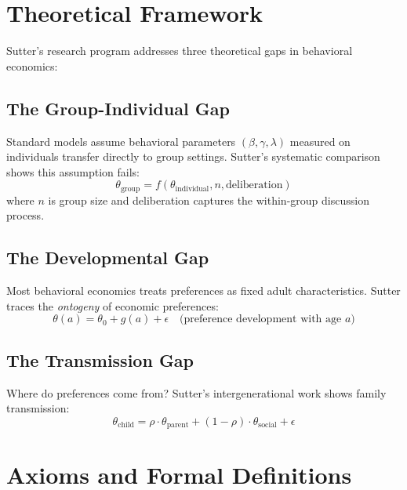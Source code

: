 \section{Theoretical Framework}
\label{sec:su-theory}

Sutter's research program addresses three theoretical gaps in behavioral economics:

\subsection{The Group-Individual Gap}

Standard models assume behavioral parameters $(\beta, \gamma, \lambda)$ measured on individuals transfer directly to group settings. Sutter's systematic comparison shows this assumption fails:
\begin{equation}
\theta_{\text{group}} = f(\theta_{\text{individual}}, n, \text{deliberation})
\end{equation}
where $n$ is group size and deliberation captures the within-group discussion process.

\subsection{The Developmental Gap}

Most behavioral economics treats preferences as fixed adult characteristics. Sutter traces the \textit{ontogeny} of economic preferences:
\begin{equation}
\theta(a) = \theta_0 + g(a) + \epsilon \quad \text{(preference development with age } a \text{)}
\end{equation}

\subsection{The Transmission Gap}

Where do preferences come from? Sutter's intergenerational work shows family transmission:
\begin{equation}
\theta_{\text{child}} = \rho \cdot \theta_{\text{parent}} + (1-\rho) \cdot \theta_{\text{social}} + \epsilon
\end{equation}


\section{Axioms and Formal Definitions}
\label{sec:su-axioms}

